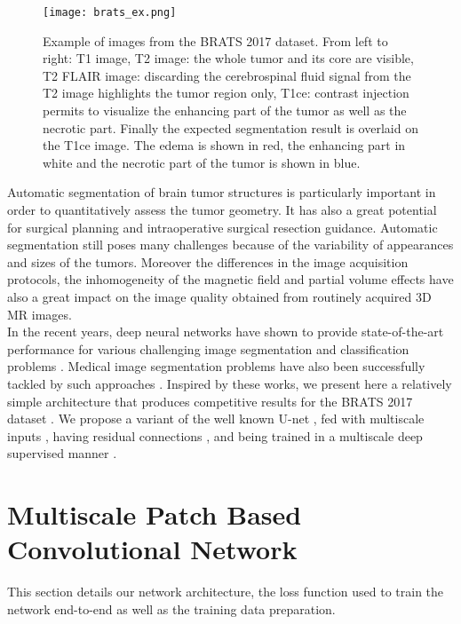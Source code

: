 \documentclass[11pt]{article}
\begin{document}
\begin{figure}[httb]
    \centering
    \texttt{[image: brats\_ex.png]}
    \caption{Example of images from the BRATS 2017 dataset. From left to right: T1 image, T2 image: the whole tumor and its core are visible, T2 FLAIR image: discarding the cerebrospinal fluid signal from the T2 image highlights the tumor region only, T1ce: contrast injection permits to visualize the enhancing part of the tumor as well as the necrotic part. Finally the expected segmentation result is overlaid on the T1ce image. The edema is shown in red, the enhancing part in white and the necrotic part of the tumor is shown in blue. }
    \label{bratsex}
\end{figure}

Automatic segmentation of brain tumor structures is particularly important in order to quantitatively assess the tumor geometry. It has also a great potential for surgical planning and intraoperative surgical resection guidance. Automatic segmentation still poses many challenges because of the variability of appearances and sizes of the tumors. Moreover the differences in the image acquisition protocols, the inhomogeneity of the magnetic field and partial volume effects have also a great impact on the image quality obtained from routinely acquired 3D MR images.\\

In the recent years, deep neural networks have shown to provide state-of-the-art performance for various challenging image segmentation and classification problems \cite{FCN,FCN-CRF,segnet,dilnet,Deconv}. Medical image segmentation problems have also been successfully tackled by such approaches \cite{UNET,VNET,deepsuper2,deepsuper3,cascade}. Inspired by these works, we present here a relatively simple architecture that produces competitive results for the BRATS 2017 dataset \cite{brats1,brats2,brats3,brats4}. We propose a variant of the well known U-net \cite{UNET}, fed with multiscale inputs \cite{multiscalenet}, having residual connections \cite{ResNet}, and being trained in a multiscale deep supervised manner \cite{deepsuper}.\\

\section{Multiscale Patch Based Convolutional Network}

This section details our network architecture, the loss function used to train the network end-to-end as well as the training data preparation.
\end{document}
